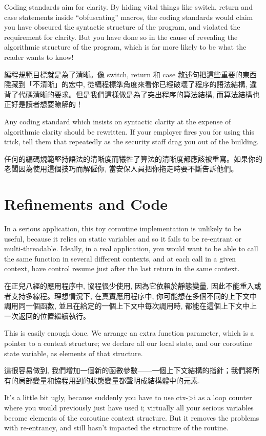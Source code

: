\documentclass[12pt]{article}
\begin{document}
\begin{CJK}{UTF8}{bsmi}
Coding standards aim for clarity. By hiding vital things like switch, return and case statements inside ``obfuscating'' macros, the coding standards would claim you have obscured the syntactic structure of the program, and violated the requirement for clarity. But you have done so in the cause of revealing the algorithmic structure of the program, which is far more likely to be what the reader wants to know!

編程規範目標就是為了清晰。像 switch, return 和 case 敘述句把這些重要的東西隱藏到「不清晰」的宏中, 從編程標準角度來看你已經破壞了程序的語法結構, 違背了代碼清晰的要求。但是我們這樣做是為了突出程序的算法結構, 而算法結構也正好是讀者想要瞭解的！

Any coding standard which insists on syntactic clarity at the expense of algorithmic clarity should be rewritten. If your employer fires you for using this trick, tell them that repeatedly as the security staff drag you out of the building.

 任何的編碼規範堅持語法的清晰度而犧牲了算法的清晰度都應該被重寫。如果你的老闆因為使用這個技巧而解僱你, 當安保人員把你拖走時要不斷告訴他們。 
\section{Refinements and Code}

In a serious application, this toy coroutine implementation is unlikely to be useful, because it relies on static variables and so it fails to be re-entrant or multi-threadable. Ideally, in a real application, you would want to be able to call the same function in several different contexts, and at each call in a given context, have control resume just after the last return in the same context.

 在正兒八經的應用程序中, 協程很少使用, 因為它依賴於靜態變量, 因此不能重入或者支持多線程。理想情況下, 在真實應用程序中, 你可能想在多個不同的上下文中調用同一個函數, 並且在給定的一個上下文中每次調用時, 都能在這個上下文中上一次返回的位置繼續執行。 

This is easily enough done. We arrange an extra function parameter, which is a pointer to a context structure; we declare all our local state, and our coroutine state variable, as elements of that structure.

 這很容易做到, 我們增加一個新的函數參數——一個上下文結構的指針；我們將所有的局部變量和協程用到的狀態變量都聲明成結構體中的元素. 

It's a little bit ugly, because suddenly you have to use ctx->i as a loop counter where you would previously just have used i; virtually all your serious variables become elements of the coroutine context structure. But it removes the problems with re-entrancy, and still hasn't impacted the structure of the routine.


\end{CJK}
\end{document}
